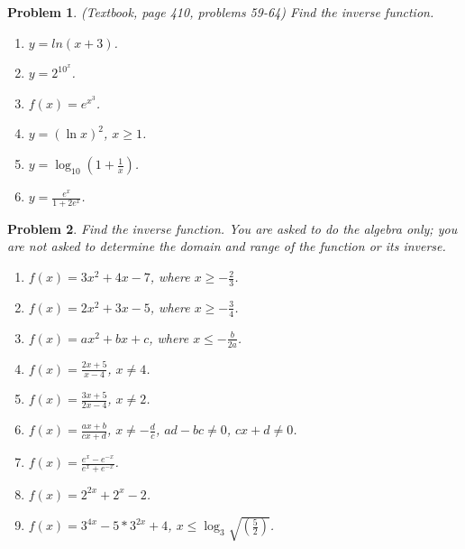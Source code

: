 \documentclass{article}
\newtheorem{problem}{Problem}
\begin{document}
\begin{problem} (Textbook, page 410, problems 59-64)
Find the inverse function. 
\begin{multicols}{2}
\begin{enumerate}
\item $y=ln (x+3)$.
\item $y=2^{10^x}$.
\item $f(x)=e^{x^3}$.
\item $y=(\ln x)^2$, $x\geq 1$.
\item $y=\log_{10}\left(1+\frac{1}{x} \right)$.
\item $y=\frac{e^x}{1+2e^x}$.
\end{enumerate}
\end{multicols}
\end{problem}
\begin{problem}
Find the inverse function. You are asked to do the algebra only; you are not asked to determine the domain and range of the function or its inverse. 
\begin{multicols}{2}
\begin{enumerate}
\item $f(x)= 3x^2+4x-7$, where $x\geq -\frac{2}{3}$.
\item $f(x)= 2x^2+3x-5$, where $x\geq -\frac{3}{4}$.
\item $f(x)=ax^2+bx+c$, where $x\leq -\frac{b}{2a}$.
\item $f(x)= \frac{2x+5}{x-4}$, $x\neq 4$.
\item $f(x)= \frac{3x+5}{2x-4}$, $x\neq 2$.
\item $f(x)=\frac{ax+b}{cx+d}$, $x\neq -\frac{d}c$, $ad-bc\neq 0$, $cx+d\neq 0$.
\item $f(x)=\frac{e^x- e^{-x}}{e^x+e^{-x}}$.
\item $f(x)=2^{2x}+2^{x}-2$.
\item $f(x)=3^{4x}- 5* 3^{2x}+4$, $x\leq \log_{3}\sqrt{\left(\frac{5}{2}\right)}$.
\end{enumerate}
\end{multicols}
\end{problem}
\end{document}
